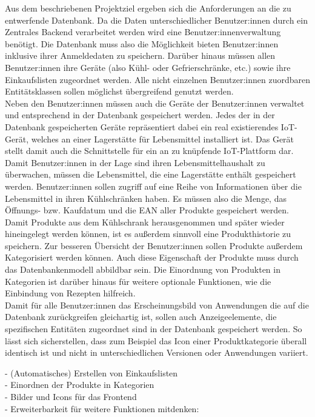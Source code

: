 Aus dem beschriebenen Projektziel ergeben sich die Anforderungen an die zu entwerfende Datenbank. Da die Daten unterschiedlicher Benutzer:innen durch ein Zentrales \gls{Backend} verarbeitet werden wird eine Benutzer:innenverwaltung benötigt. Die Datenbank muss also die Möglichkeit bieten Benutzer:innen inklusive ihrer Anmeldedaten zu speichern. Darüber hinaus müssen allen Benutzer:innen ihre Geräte (also Kühl- oder Gefrierschränke, etc.) sowie ihre Einkaufslisten zugeordnet werden. Alle nicht einzelnen Benutzer:innen zuordbaren \Gls{Entitätsklasse}n sollen möglichst übergreifend genutzt werden.\\ Neben den Benutzer:innen müssen auch die Geräte der Benutzer:innen verwaltet und entsprechend in der Datenbank gespeichert werden. Jedes der in der Datenbank gespeicherten Geräte repräsentiert dabei ein real existierendes IoT-Gerät, welches an einer Lagerstätte für Lebensmittel installiert ist. Das Gerät stellt damit auch die Schnittstelle für ein an zu knüpfende IoT-Plattform dar.\\ Damit Benutzer:innen in der Lage sind ihren Lebensmittelhaushalt zu überwachen, müssen die Lebensmittel, die eine Lagerstätte enthält gespeichert werden. Benutzer:innen sollen zugriff auf eine Reihe von Informationen über die Lebensmittel in ihren Kühlschränken haben. Es müssen also die Menge, das Öffnungs- bzw. Kaufdatum und die \gls{EAN} aller Produkte gespeichert werden. Damit Produkte aus dem Kühlschrank herausgenommen und später wieder hineingelegt werden können, ist es außerdem sinnvoll eine Produkthistorie zu speichern. Zur besseren Übersicht der Benutzer:innen sollen Produkte außerdem Kategorisiert werden können. Auch diese Eigenschaft der Produkte muss durch das Datenbankenmodell abbildbar sein. Die Einordnung von Produkten in Kategorien ist darüber hinaus für weitere optionale Funktionen, wie die Einbindung von Rezepten hilfreich.\\ Damit für alle Benutzer:innen das Erscheinungsbild von Anwendungen die auf die Datenbank zurückgreifen gleichartig ist, sollen auch Anzeigeelemente, die spezifischen Entitäten zugeordnet sind in der Datenbank gespeichert werden. So lässt sich sicherstellen, dass zum Beispiel das Icon einer Produktkategorie überall identisch ist und nicht in unterschiedlichen Versionen oder Anwendungen variiert.

- (Automatisches) Erstellen von Einkaufslisten\\
- Einordnen der Produkte in Kategorien\\
- Bilder und Icons für das Frontend\\
- Erweiterbarkeit für weitere Funktionen mitdenken:\\
